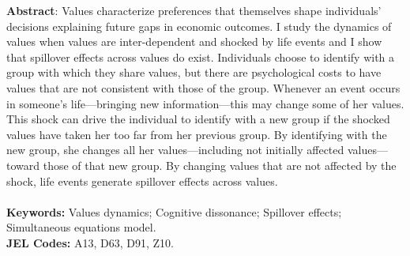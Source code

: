 \noindent \textbf{Abstract}: Values characterize preferences that themselves shape individuals’ decisions explaining future gaps in economic outcomes. I study the dynamics of values when values are inter-dependent and shocked by life events and I show that spillover effects across values do exist. Individuals choose to identify with a group with which they share values, but there are psychological costs to have values that are not consistent with those of the group. Whenever an event occurs in someone’s life---bringing new information---this may change some of her values. This shock can drive the individual to identify with a new group if the shocked values have taken her too far from her previous group. By identifying with the new group, she changes all her values---including not initially affected values---toward those of that new group. By changing values that are not affected by the shock, life events generate spillover effects across values.\\
\vspace{1em}\\
\noindent\textbf{Keywords:} Values dynamics; Cognitive dissonance; Spillover effects; Simultaneous equations model.\\
\noindent\textbf{JEL Codes:} A13, D63, D91, Z10.

\clearpage
\chaptertoc{}

\pagebreak


